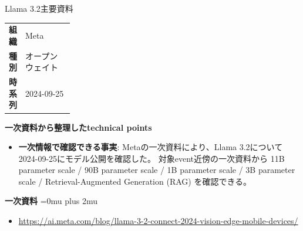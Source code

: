 \begin{technicalnote}{Llama 3.2}{主要資料}
\begingroup
\begin{tabularx}{\linewidth}{@{}>{\bfseries}p{0.22\linewidth}X@{}}
組織 & Meta \\
種別 & オープンウェイト \\
時系列 & 2024-09-25 \\
\end{tabularx}
\smallskip
{\bfseries 一次資料から整理したtechnical points}
\begin{itemize}[leftmargin=1.5em,itemsep=0.35em]
\item \textbf{一次情報で確認できる事実}: Metaの一次資料により、Llama 3.2について2024-09-25にモデル公開を確認した。 対象event近傍の一次資料から 11B parameter scale / 90B parameter scale / 1B parameter scale / 3B parameter scale / Retrieval-Augmented Generation (RAG) を確認できる。
\end{itemize}
\begin{minipage}{\linewidth}
\begin{samepage}
{\bfseries 一次資料}
\begingroup\sloppy
\Urlmuskip=0mu plus 2mu\relax
\begin{itemize}[leftmargin=1.5em,itemsep=0.25em]
\item {\scriptsize\url{https://ai.meta.com/blog/llama-3-2-connect-2024-vision-edge-mobile-devices/}}
\end{itemize}
\endgroup
\end{samepage}
\end{minipage}
\endgroup
\end{technicalnote}
\medskip

